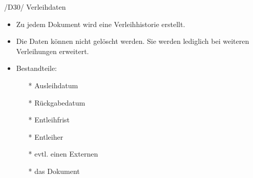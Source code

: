 /D30/ Verleihdaten
\begin{itemize}
  \item Zu jedem Dokument wird eine Verleihhistorie erstellt.
  \item Die Daten können nicht gelöscht werden. Sie werden lediglich bei weiteren Verleihungen erweitert.
  \item Bestandteile:
  \begin{itemize}
    \item[*] Ausleihdatum
    \item[*] Rückgabedatum
    \item[*] Entleihfrist
    \item[*] Entleiher
    \item[*] evtl. einen Externen
    \item[*] das Dokument
  \end{itemize}
\end{itemize}